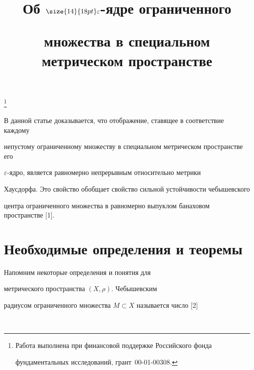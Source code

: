 \title{Об $\size{14}{18pt}\selectfont\varepsilon$-ядре ограниченного


множества в специальном метрическом пространстве }


\thanks{Работа выполнена при финансовой поддержке Российского фонда


фундаментальных исследований, грант \No\,00-01-00308.}





\date{}




\pagestyle{plain} %







\maketitle


\label{begin}








В данной статье доказывается, что отображение, ставящее в соответствие каждому 


непустому ограниченному множеству в специальном метрическом пространстве его    


$\varepsilon$-ядро, является равномерно непрерывным относительно метрики


Хаусдорфа. Это свойство обобщает свойство сильной устойчивости чебышевского


центра ограниченного множества в равномерно выпуклом банаховом пространстве [1].





\section{Необходимые определения и теоремы}





Напомним некоторые определения и понятия для 


метрического пространства $(X,\rho)$. Чебышевским 


радиусом ограниченного множества $M \subset X$ называется число [2]


$$



